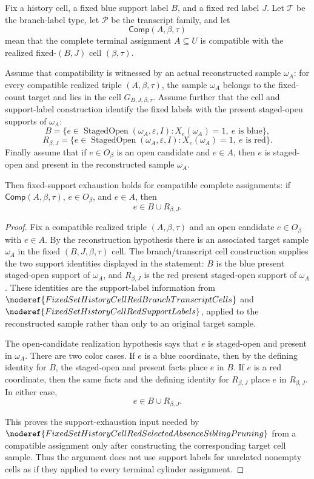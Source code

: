 \begin{helper}
Fix a history cell, a fixed blue support label \(B\), and a fixed red label
\(J\).  Let \(\mathcal T\) be the branch-label type, let \(\mathcal P\) be
the transcript family, and let
\[
\mathsf{Comp}(A,\beta,\tau)
\]
mean that the complete terminal assignment \(A\subseteq U\) is compatible
with the realized fixed-\((B,J)\) cell \((\beta,\tau)\).

Assume that compatibility is witnessed by an actual reconstructed sample
\(\omega_A\): for every compatible realized triple
\((A,\beta,\tau)\), the sample \(\omega_A\) belongs to the fixed-count target
and lies in the cell \(G_{B,J,\beta,\tau}\).  Assume further that the cell
and support-label construction identify the fixed labels with the present
staged-open supports of \(\omega_A\):
\[
B=
\{e\in\operatorname{StagedOpen}(\omega_A,\varepsilon,I):
  X_e(\omega_A)=1,\ e\text{ is blue}\},
\]
\[
R_{\beta,J}=
\{e\in\operatorname{StagedOpen}(\omega_A,\varepsilon,I):
  X_e(\omega_A)=1,\ e\text{ is red}\}.
\]
Finally assume that if \(e\in O_\beta\) is an open candidate and \(e\in A\),
then \(e\) is staged-open and present in the reconstructed sample
\(\omega_A\).

Then fixed-support exhaustion holds for compatible complete assignments: if
\(\mathsf{Comp}(A,\beta,\tau)\), \(e\in O_\beta\), and \(e\in A\), then
\[
e\in B\cup R_{\beta,J}.
\]
\end{helper}
\begin{proof}
Fix a compatible realized triple \((A,\beta,\tau)\) and an open candidate
\(e\in O_\beta\) with \(e\in A\).  By the reconstruction hypothesis there is
an associated target sample \(\omega_A\) in the fixed
\((B,J,\beta,\tau)\) cell.  The branch/transcript cell construction supplies
the two support identities displayed in the statement: \(B\) is the blue
present staged-open support of \(\omega_A\), and \(R_{\beta,J}\) is the red
present staged-open support of \(\omega_A\).  These identities are the
support-label information from
\(\noderef{FixedSetHistoryCellRedBranchTranscriptCells}\) and
\(\noderef{FixedSetHistoryCellRedSupportLabels}\), applied to the
reconstructed sample rather than only to an original target sample.

The open-candidate realization hypothesis says that \(e\) is staged-open and
present in \(\omega_A\).  There are two color cases.  If \(e\) is a blue
coordinate, then by the defining identity for \(B\), the staged-open and
present facts place \(e\) in \(B\).  If \(e\) is a red coordinate, then the
same facts and the defining identity for \(R_{\beta,J}\) place \(e\) in
\(R_{\beta,J}\).  In either case,
\[
e\in B\cup R_{\beta,J}.
\]

This proves the support-exhaustion input needed by
\(\noderef{FixedSetHistoryCellRedSelectedAbsenceSiblingPruning}\) from a
compatible assignment only after constructing the corresponding target cell
sample.  Thus the argument does not use support labels for unrelated
nonempty cells as if they applied to every terminal cylinder assignment.
\end{proof}
